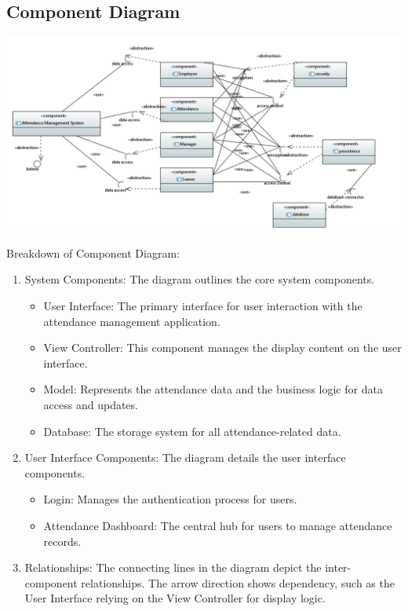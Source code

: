 \documentclass[a4paper, 12pt]{article}
\begin{document}
\subsection{Component Diagram}
\begin{center}
\includegraphics[width=1\textwidth]{Attendance_Management_System_Component_Diagram.PNG}\par
\end{center}
Breakdown of Component Diagram:
\begin{enumerate}
    \item System Components: The diagram outlines the core system components.
    \begin{itemize}
        \item User Interface: The primary interface for user interaction with the attendance management application.
        \item View Controller: This component manages the display content on the user interface.
        \item Model: Represents the attendance data and the business logic for data access and updates.
        \item Database: The storage system for all attendance-related data.
    \end{itemize}
    \item User Interface Components: The diagram details the user interface components.
    \begin{itemize}
        \item Login: Manages the authentication process for users.
        \item Attendance Dashboard: The central hub for users to manage attendance records.
    \end{itemize}
    \item Relationships: The connecting lines in the diagram depict the inter-component relationships. The arrow direction shows dependency, such as the User Interface relying on the View Controller for display logic.
\end{enumerate}
\end{document}
